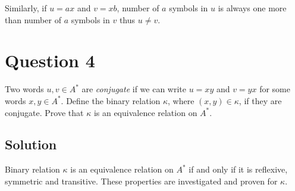 Similarly, if $u = ax$ and $v = xb$, number of $a$ symbols in $u$ is always one more than number of $a$ symbols in $v$ thus $u \neq v$.

\section*{Question 4}

Two words $u, v \in A^*$ are \textit{conjugate} if we can write $u=xy$ and $v=yx$ for some words $x,y \in A^*$.
Define the binary relation $\kappa$, where $\left( x,y \right) \in \kappa$, if they are conjugate.
Prove that $\kappa$ is an equivalence relation on $A^* $.

\subsection*{Solution}

Binary relation $\kappa$ is an equivalence relation on $A^*$ if and only if it is reflexive, symmetric and transitive. These properties are investigated and proven for $\kappa$.

